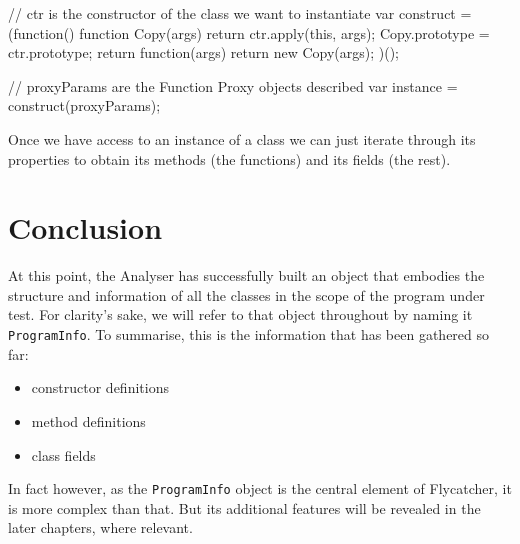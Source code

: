 \begin{code}[caption=Instantiating a \texttt{Function} object,label=instantiatingfn]
// ctr is the constructor of the class we want to instantiate
var construct = (function() {
    function Copy(args) {
        return ctr.apply(this, args);
    }
    Copy.prototype = ctr.prototype;
    return function(args) {
        return new Copy(args);
    }
})();

// proxyParams are the Function Proxy objects described
var instance = construct(proxyParams);
\end{code}

Once we have access to an instance of a class we can just iterate through its properties to obtain its methods (the functions) and its fields (the rest).

\section{Conclusion}
At this point, the Analyser has successfully built an object that embodies the structure and information of all the classes in the scope of the program under test. For clarity's sake, we will refer to that object throughout by naming it \texttt{ProgramInfo}. To summarise, this is the information that has been gathered so far:

\begin{itemize}
   \item constructor definitions \checkmark
   \item method definitions \checkmark
   \item class fields \checkmark
\end{itemize}

In fact however, as the \texttt{ProgramInfo} object is the central element of \textsf{Flycatcher}, it is more complex than that. But its additional features will be revealed in the later chapters, where relevant.